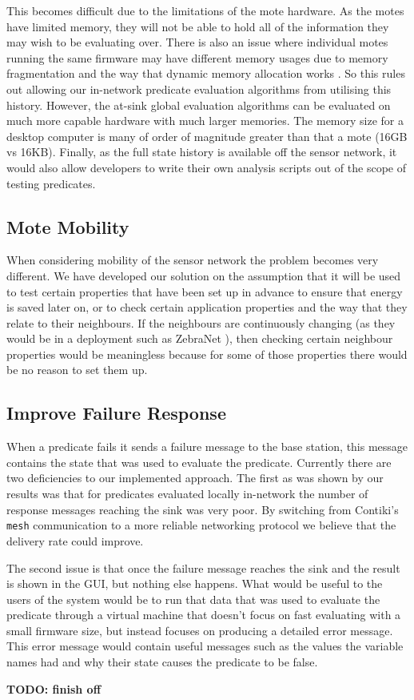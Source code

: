 This becomes difficult due to the limitations of the mote hardware. As the motes have limited memory, they will not be able to hold all of the information they may wish to be evaluating over. There is also an issue where individual motes running the same firmware may have different memory usages due to memory fragmentation and the way that dynamic memory allocation works \cite{Dai:2004:EEL:1031495.1031516}. So this rules out allowing our in-network predicate evaluation algorithms from utilising this history. However, the at-sink global evaluation algorithms can be evaluated on much more capable hardware with much larger memories. The memory size for a desktop computer is many of order of magnitude greater than that a mote (16GB vs 16KB). Finally, as the full state history is available off the sensor network, it would also allow developers to write their own analysis scripts out of the scope of testing predicates.


\subsection{Mote Mobility}

When considering mobility of the sensor network the problem becomes very different. We have developed our solution on the assumption that it will be used to test certain properties that have been set up in advance to ensure that energy is saved later on, or to check certain application properties and the way that they relate to their neighbours. If the neighbours are continuously changing (as they would be in a deployment such as ZebraNet \cite{Juang:2002:ECW:635508.605408}), then checking certain neighbour properties would be meaningless because for some of those properties there would be no reason to set them up.

\subsection{Improve Failure Response}

When a predicate fails it sends a failure message to the base station, this message contains the state that was used to evaluate the predicate. Currently there are two deficiencies to our implemented approach. The first as was shown by our results was that for predicates evaluated locally in-network the number of response messages reaching the sink was very poor. By switching from Contiki's \verb|mesh| communication to a more reliable networking protocol we believe that the delivery rate could improve.

The second issue is that once the failure message reaches the sink and the result is shown in the GUI, but nothing else happens. What would be useful to the users of the system would be to run that data that was used to evaluate the predicate through a virtual machine that doesn't focus on fast evaluating with a small firmware size, but instead focuses on producing a detailed error message. This error message would contain useful messages such as the values the variable names had and why their state causes the predicate to be false.

\textbf{TODO: finish off}
